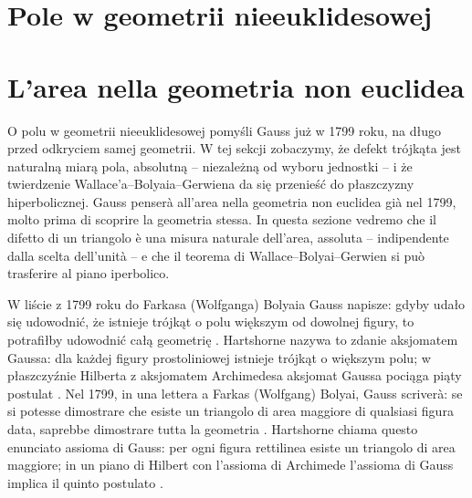 
\section{Pole w geometrii nieeuklidesowej} %
\section{L'area nella geometria non euclidea} %
\label{sekcja_pole_hartshorne}

O polu w geometrii nieeuklidesowej pomyśli Gauss już w 1799 roku, na długo przed odkryciem samej geometrii. %
W tej sekcji zobaczymy, że defekt trójkąta jest naturalną miarą pola, absolutną -- niezależną od wyboru jednostki -- i że twierdzenie Wallace'a--Bolyaia--Gerwiena da się przenieść do płaszczyzny hiperbolicznej. %
Gauss penserà all'area nella geometria non euclidea già nel 1799, molto prima di scoprire la geometria stessa. %
In questa sezione vedremo che il difetto di un triangolo è una misura naturale dell'area, assoluta -- indipendente dalla scelta dell'unità -- e che il teorema di Wallace--Bolyai--Gerwien si può trasferire al piano iperbolico. %

W liście z 1799 roku do Farkasa (Wolfganga) Bolyaia Gauss napisze: gdyby udało się udowodnić, że istnieje trójkąt o polu większym od dowolnej figury, to potrafiłby udowodnić całą geometrię \cite[s. 332, zad. 36.1]{hartshorne_2000}. %
Hartshorne nazywa to zdanie aksjomatem Gaussa: dla każdej figury prostoliniowej istnieje trójkąt o większym polu; w płaszczyźnie Hilberta z aksjomatem Archimedesa aksjomat Gaussa pociąga piąty postulat \cite[s. 332]{hartshorne_2000}. %
Nel 1799, in una lettera a Farkas (Wolfgang) Bolyai, Gauss scriverà: se si potesse dimostrare che esiste un triangolo di area maggiore di qualsiasi figura data, saprebbe dimostrare tutta la geometria \cite[p. 332, es. 36.1]{hartshorne_2000}. %
Hartshorne chiama questo enunciato assioma di Gauss: per ogni figura rettilinea esiste un triangolo di area maggiore; in un piano di Hilbert con l'assioma di Archimede l'assioma di Gauss implica il quinto postulato \cite[p. 332]{hartshorne_2000}. %
%

